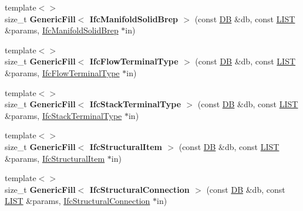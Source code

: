 \begin{DoxyCompactItemize}
\item 
\hypertarget{namespace_assimp_1_1_s_t_e_p_a47848679ee5e035eff0a3d94595ea9c0}{{\footnotesize template$<$$>$ }\\size\+\_\+t {\bfseries Generic\+Fill$<$ Ifc\+Manifold\+Solid\+Brep $>$} (const \hyperlink{class_assimp_1_1_s_t_e_p_1_1_d_b}{D\+B} \&db, const \hyperlink{class_assimp_1_1_s_t_e_p_1_1_e_x_p_r_e_s_s_1_1_l_i_s_t}{L\+I\+S\+T} \&params, \hyperlink{struct_assimp_1_1_i_f_c_1_1_ifc_manifold_solid_brep}{Ifc\+Manifold\+Solid\+Brep} $\ast$in)}\label{namespace_assimp_1_1_s_t_e_p_a47848679ee5e035eff0a3d94595ea9c0}

\item 
\hypertarget{namespace_assimp_1_1_s_t_e_p_afc2f6fae0151d8035acd09197ba155b8}{{\footnotesize template$<$$>$ }\\size\+\_\+t {\bfseries Generic\+Fill$<$ Ifc\+Flow\+Terminal\+Type $>$} (const \hyperlink{class_assimp_1_1_s_t_e_p_1_1_d_b}{D\+B} \&db, const \hyperlink{class_assimp_1_1_s_t_e_p_1_1_e_x_p_r_e_s_s_1_1_l_i_s_t}{L\+I\+S\+T} \&params, \hyperlink{struct_assimp_1_1_i_f_c_1_1_ifc_flow_terminal_type}{Ifc\+Flow\+Terminal\+Type} $\ast$in)}\label{namespace_assimp_1_1_s_t_e_p_afc2f6fae0151d8035acd09197ba155b8}

\item 
\hypertarget{namespace_assimp_1_1_s_t_e_p_aaede45aa5f8f7750efaa184598400224}{{\footnotesize template$<$$>$ }\\size\+\_\+t {\bfseries Generic\+Fill$<$ Ifc\+Stack\+Terminal\+Type $>$} (const \hyperlink{class_assimp_1_1_s_t_e_p_1_1_d_b}{D\+B} \&db, const \hyperlink{class_assimp_1_1_s_t_e_p_1_1_e_x_p_r_e_s_s_1_1_l_i_s_t}{L\+I\+S\+T} \&params, \hyperlink{struct_assimp_1_1_i_f_c_1_1_ifc_stack_terminal_type}{Ifc\+Stack\+Terminal\+Type} $\ast$in)}\label{namespace_assimp_1_1_s_t_e_p_aaede45aa5f8f7750efaa184598400224}

\item 
\hypertarget{namespace_assimp_1_1_s_t_e_p_a6871aebc888340dc18d91102c4dd2060}{{\footnotesize template$<$$>$ }\\size\+\_\+t {\bfseries Generic\+Fill$<$ Ifc\+Structural\+Item $>$} (const \hyperlink{class_assimp_1_1_s_t_e_p_1_1_d_b}{D\+B} \&db, const \hyperlink{class_assimp_1_1_s_t_e_p_1_1_e_x_p_r_e_s_s_1_1_l_i_s_t}{L\+I\+S\+T} \&params, \hyperlink{struct_assimp_1_1_i_f_c_1_1_ifc_structural_item}{Ifc\+Structural\+Item} $\ast$in)}\label{namespace_assimp_1_1_s_t_e_p_a6871aebc888340dc18d91102c4dd2060}

\item 
\hypertarget{namespace_assimp_1_1_s_t_e_p_a6e8e9ef28e265017dfc253846860d753}{{\footnotesize template$<$$>$ }\\size\+\_\+t {\bfseries Generic\+Fill$<$ Ifc\+Structural\+Connection $>$} (const \hyperlink{class_assimp_1_1_s_t_e_p_1_1_d_b}{D\+B} \&db, const \hyperlink{class_assimp_1_1_s_t_e_p_1_1_e_x_p_r_e_s_s_1_1_l_i_s_t}{L\+I\+S\+T} \&params, \hyperlink{struct_assimp_1_1_i_f_c_1_1_ifc_structural_connection}{Ifc\+Structural\+Connection} $\ast$in)}\label{namespace_assimp_1_1_s_t_e_p_a6e8e9ef28e265017dfc253846860d753}


\end{DoxyCompactItemize}
